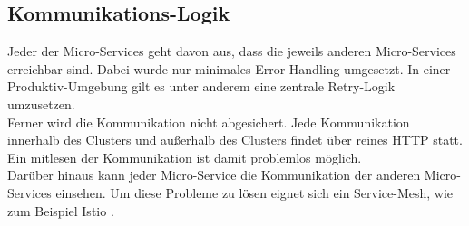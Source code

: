 \subsection{Kommunikations-Logik}
Jeder der Micro-Services geht davon aus, dass die jeweils anderen Micro-Services erreichbar sind. Dabei wurde nur minimales Error-Handling umgesetzt. In einer Produktiv-Umgebung gilt es unter anderem eine zentrale Retry-Logik umzusetzen.\\
Ferner wird die Kommunikation nicht abgesichert. Jede Kommunikation innerhalb des Clusters und außerhalb des Clusters findet über reines HTTP statt. Ein mitlesen der Kommunikation ist damit problemlos möglich.\\
Darüber hinaus kann jeder Micro-Service die Kommunikation der anderen Micro-Services einsehen. Um diese Probleme zu lösen eignet sich ein Service-Mesh, wie zum Beispiel Istio \cite{istio_istio_nodate}.
















